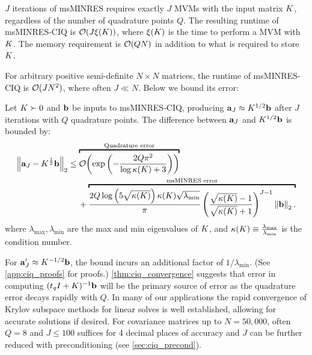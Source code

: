 \begin{property}
  $J$ iterations of msMINRES requires exactly $J$ MVMs with the input matrix $K$,
  regardless of the number of quadrature points $Q$.
  The resulting runtime of msMINRES-CIQ is $\bigo{ J \mvm{\bK}}$, where $\xi ( K )$ is the time to perform a MVM with $K$.
  The memory requirement is $\bigo{ QN }$ in addition to what is required to store $K$.
  \label{prop:msminres}
\end{property}
%
\noindent
For arbitrary positive semi-definite $N \! \times \! N$ matrices, the runtime of msMINRES-CIQ is $\bigo{J N^2}$, where often $J \ll N$.
Below we bound its error:
%
\begin{theorem}
  Let $K \succ 0$ and $\mathbf{b}$ be inputs to msMINRES-CIQ, producing $\mathbf{a}_J \approx K^{1/2} \mathbf{b}$ after $J$ iterations with $Q$ quadrature points.
  The difference between $\mathbf{a}_J$ and $K^{1/2} \mathbf{b}$ is bounded by:
  \begin{align*}
    \left\Vert \ba_J - \bK^{\frac 1 2} \bb \right\Vert_2
    &\leq
    \overbracket{
      \bigo{\exp\left( -\frac  {2 Q \pi^2}{\log \kappa(\bK) + 3} \right)}
    }^{\text{Quadrature error}}
    \\
    &\phantom{=} \:\: +
    \overbracket{
      \frac{ 2 Q \log \left( 5 \sqrt{\kappa(\bK)} \right) \kappa(\bK) \sqrt{\lambda_\text{min}} }{\pi}
      \left( \frac{ \sqrt{\kappa(\bK)} - 1}{ \sqrt{\kappa(\bK)} + 1} \right)^{J-1}
      \left\Vert \bb \right\Vert_2.
    }^{\text{msMINRES error}}
  \end{align*}
  where $\lambda_\text{max},\lambda_{\text{min}}$ are the max and min eigenvalues of $K$, and $\kappa(K) \equiv \tfrac{\lambda_\text{max}}{\lambda_\text{min}}$ is the condition number.
  \label{thm:ciq_convergence}
\end{theorem}
%
\noindent
For $\mathbf{a}'_J \approx K^{-1/2} \mathbf{b}$, the bound incurs an additional factor of $1/\lambda_\text{min}$.
(See \cref{app:ciq_proofs} for proofs.)
\cref{thm:ciq_convergence} suggests that error in computing $(t_q I + K)^{-1}\mathbf{b}$  will be the primary source of error as the quadrature error decays rapidly with $Q$. In many of our applications the rapid convergence of Krylov subspace methods for linear solves is well established, allowing for accurate solutions if desired.
For covariance matrices up to $N=50,\!000$, often $Q=8$ and $J\leq100$ suffices for 4 decimal places of accuracy and $J$ can be further reduced with preconditioning (see \cref{sec:ciq_precond}).



